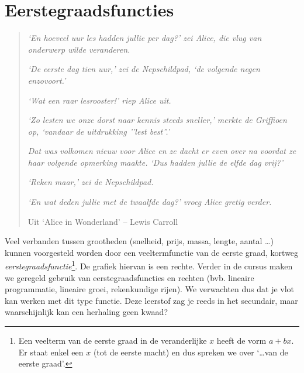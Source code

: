 %
%
\chapter{Eerstegraadsfuncties}
\label{chap:eerstegraadsfuncties}
\begin{quote}
     \textit{{\small `En hoeveel uur les hadden jullie per dag?' zei
     Alice, die vlug van onderwerp wilde veranderen.}}

     \textit{{\small `De eerste dag tien uur,' zei de Nepschildpad,
     `de volgende negen enzovoort.'}}

     \textit{{\small `Wat een raar lesrooster!' riep Alice uit.}}

     \textit{{\small `Zo lesten we onze dorst naar kennis steeds
     sneller,' merkte de Griffioen op, `vandaar de uitdrukking ''lest
     best''.'}}

     \textit{{\small Dat was volkomen nieuw voor Alice en ze dacht er
     even over na voordat ze haar volgende opmerking maakte. `Dus
     hadden jullie de elfde dag vrij?'}}

     \textit{{\small `Reken maar,' zei de Nepschildpad.}}

     \textit{{\small `En wat deden jullie met de twaalfde dag?' vroeg
     Alice gretig verder.}}

          Uit `Alice in Wonderland' -- Lewis Carroll
\end{quote}


\newpage
\noindent Veel verbanden tussen grootheden (snelheid, prijs, massa, lengte, aantal \ldots) kunnen voorgesteld worden door een veeltermfunctie van de eerste graad, kortweg \emph{eerstegraadsfunctie}\footnote{Een veelterm van de eerste graad in de veranderlijke $x$ heeft de vorm $a+bx$. Er staat enkel een $x$ (tot de eerste macht) en dus spreken we over `\ldots van de eerste graad'.}. De grafiek hiervan is een rechte. Verder in de cursus maken we geregeld gebruik van eerstegraadsfuncties en rechten (bvb. lineaire programmatie, lineaire groei, rekenkundige rijen). We verwachten dus dat je vlot kan werken met dit type functie. Deze leerstof zag je reeds in het secundair, maar waarschijnlijk kan een herhaling geen kwaad?

